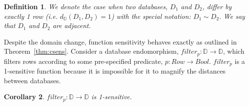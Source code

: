 \documentclass[12pt]{report}
\newtheorem{defn}{Definition}[chapter]
\newtheorem{cor}[defn]{Corollary}
\begin{document}
\begin{defn}
  We denote the case when two databases, $D_1$ and $D_2$, differ by exactly 1 row (i.e. $d_{\mathbb D}(D_1,D_2)=1$) with the special notation: $D_1 \sim D_2$.
  We say that $D_1$ and $D_2$ are adjacent.
\end{defn}

Despite the domain change, function sensitivity behaves exactly as outlined in Theorem~\ref{thm:csens}.
Consider a database endomorphism, $filter_p : \mathbb D \rightarrow \mathbb D$, which filters rows according to some pre-specified predicate, $p : Row \rightarrow Bool$.
$filter_p$ is a 1-sensitive function because it is impossible for it to magnify the distances between databases.

\begin{cor}\label{cor:filterp_1sens}
$filter_p : \mathbb D \rightarrow \mathbb D$ is 1-sensitive.
\end{cor}
\end{document}
